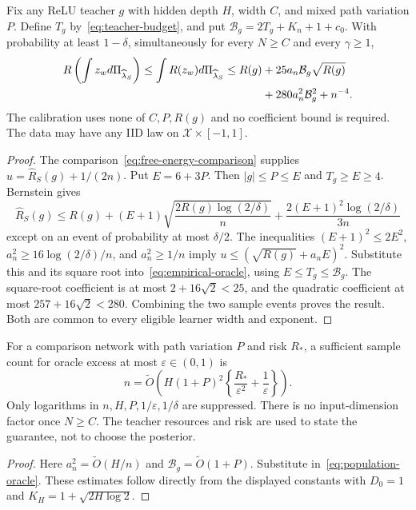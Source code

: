 \begin{theorem}
\label{thm:main}
Fix any ReLU teacher $g$ with hidden depth $H$, width $C$, and mixed path variation $P$. Define $T_g$ by~\eqref{eq:teacher-budget}, and put $\mathcal B_g=2T_g+K_n+1+c_0$. With probability at least $1-\delta$, simultaneously for every $N\ge C$ and every $\gamma\ge1$,
\begin{align}
 R\left(\int z_wd\Pi_{\widehat\lambda_S}\right)
 \le\int R(z_w)d\Pi_{\widehat\lambda_S}
 \le R(g)&+25a_n\mathcal B_g\sqrt{R(g)}\notag\\
 &+280a_n^2\mathcal B_g^2+n^{-4}.
 \label{eq:population-oracle}
\end{align}
The calibration uses none of $C,P,R(g)$ and no coefficient bound is required. The data may have any IID law on $\mathcal X\times[-1,1]$.
\end{theorem}
\begin{proof}
The comparison~\eqref{eq:free-energy-comparison} supplies $u=\widehat R_S(g)+1/(2n)$. Put $E=6+3P$. Then $|g|\le P\le E$ and $T_g\ge E\ge4$. Bernstein gives
\[
 \widehat R_S(g)\le R(g)+(E+1)\sqrt{\frac{2R(g)\log(2/\delta)}n}
                  +\frac{2(E+1)^2\log(2/\delta)}{3n}
\]
except on an event of probability at most $\delta/2$. The inequalities $(E+1)^2\le2E^2$, $a_n^2\ge16\log(2/\delta)/n$, and $a_n^2\ge1/n$ imply
$u\le(\sqrt{R(g)}+a_nE)^2$.
Substitute this and its square root into~\eqref{eq:empirical-oracle}, using $E\le T_g\le\mathcal B_g$. The square-root coefficient is at most $2+16\sqrt2<25$, and the quadratic coefficient at most $257+16\sqrt2<280$. Combining the two sample events proves the result. Both are common to every eligible learner width and exponent.
\end{proof}

\begin{corollary}
\label{cor:polynomial}
For a comparison network with path variation $P$ and risk $R_*$, a sufficient sample count for oracle excess at most $\varepsilon\in(0,1)$ is
\begin{equation}
 n=\widetilde O\left(H(1+P)^2\left\{\frac{R_*}{\varepsilon^2}+\frac1\varepsilon\right\}\right).
 \label{eq:sample-budget}
\end{equation}
Only logarithms in $n,H,P,1/\varepsilon,1/\delta$ are suppressed. There is no input-dimension factor once $N\ge C$. The teacher resources and risk are used to state the guarantee, not to choose the posterior.
\end{corollary}
\begin{proof}
Here $a_n^2=\widetilde O(H/n)$ and $\mathcal B_g=\widetilde O(1+P)$. Substitute in~\eqref{eq:population-oracle}. These estimates follow directly from the displayed constants with $D_0=1$ and $K_H=1+\sqrt{2H\log2}$.
\end{proof}

